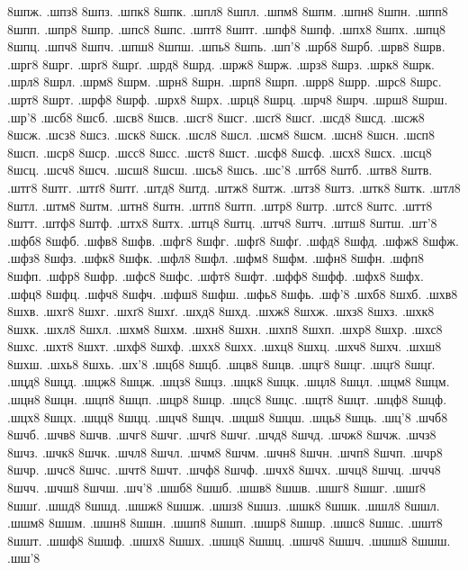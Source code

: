 {8шпж.
.шпз8
8шпз.
.шпк8
8шпк.
.шпл8
8шпл.
.шпм8
8шпм.
.шпн8
8шпн.
.шпп8
8шпп.
.шпр8
8шпр.
.шпс8
8шпс.
.шпт8
8шпт.
.шпф8
8шпф.
.шпх8
8шпх.
.шпц8
8шпц.
.шпч8
8шпч.
.шпш8
8шпш.
.шпь8
8шпь.
.шп'8
.шрб8
8шрб.
.шрв8
8шрв.
.шрг8
8шрг.
.шрґ8
8шрґ.
.шрд8
8шрд.
.шрж8
8шрж.
.шрз8
8шрз.
.шрк8
8шрк.
.шрл8
8шрл.
.шрм8
8шрм.
.шрн8
8шрн.
.шрп8
8шрп.
.шрр8
8шрр.
.шрс8
8шрс.
.шрт8
8шрт.
.шрф8
8шрф.
.шрх8
8шрх.
.шрц8
8шрц.
.шрч8
8шрч.
.шрш8
8шрш.
.шр'8
.шсб8
8шсб.
.шсв8
8шсв.
.шсг8
8шсг.
.шсґ8
8шсґ.
.шсд8
8шсд.
.шсж8
8шсж.
.шсз8
8шсз.
.шск8
8шск.
.шсл8
8шсл.
.шсм8
8шсм.
.шсн8
8шсн.
.шсп8
8шсп.
.шср8
8шср.
.шсс8
8шсс.
.шст8
8шст.
.шсф8
8шсф.
.шсх8
8шсх.
.шсц8
8шсц.
.шсч8
8шсч.
.шсш8
8шсш.
.шсь8
8шсь.
.шс'8
.штб8
8штб.
.штв8
8штв.
.штг8
8штг.
.штґ8
8штґ.
.штд8
8штд.
.штж8
8штж.
.штз8
8штз.
.штк8
8штк.
.штл8
8штл.
.штм8
8штм.
.штн8
8штн.
.штп8
8штп.
.штр8
8штр.
.штс8
8штс.
.штт8
8штт.
.штф8
8штф.
.штх8
8штх.
.штц8
8штц.
.штч8
8штч.
.штш8
8штш.
.шт'8
.шфб8
8шфб.
.шфв8
8шфв.
.шфг8
8шфг.
.шфґ8
8шфґ.
.шфд8
8шфд.
.шфж8
8шфж.
.шфз8
8шфз.
.шфк8
8шфк.
.шфл8
8шфл.
.шфм8
8шфм.
.шфн8
8шфн.
.шфп8
8шфп.
.шфр8
8шфр.
.шфс8
8шфс.
.шфт8
8шфт.
.шфф8
8шфф.
.шфх8
8шфх.
.шфц8
8шфц.
.шфч8
8шфч.
.шфш8
8шфш.
.шфь8
8шфь.
.шф'8
.шхб8
8шхб.
.шхв8
8шхв.
.шхг8
8шхг.
.шхґ8
8шхґ.
.шхд8
8шхд.
.шхж8
8шхж.
.шхз8
8шхз.
.шхк8
8шхк.
.шхл8
8шхл.
.шхм8
8шхм.
.шхн8
8шхн.
.шхп8
8шхп.
.шхр8
8шхр.
.шхс8
8шхс.
.шхт8
8шхт.
.шхф8
8шхф.
.шхх8
8шхх.
.шхц8
8шхц.
.шхч8
8шхч.
.шхш8
8шхш.
.шхь8
8шхь.
.шх'8
.шцб8
8шцб.
.шцв8
8шцв.
.шцг8
8шцг.
.шцґ8
8шцґ.
.шцд8
8шцд.
.шцж8
8шцж.
.шцз8
8шцз.
.шцк8
8шцк.
.шцл8
8шцл.
.шцм8
8шцм.
.шцн8
8шцн.
.шцп8
8шцп.
.шцр8
8шцр.
.шцс8
8шцс.
.шцт8
8шцт.
.шцф8
8шцф.
.шцх8
8шцх.
.шцц8
8шцц.
.шцч8
8шцч.
.шцш8
8шцш.
.шць8
8шць.
.шц'8
.шчб8
8шчб.
.шчв8
8шчв.
.шчг8
8шчг.
.шчґ8
8шчґ.
.шчд8
8шчд.
.шчж8
8шчж.
.шчз8
8шчз.
.шчк8
8шчк.
.шчл8
8шчл.
.шчм8
8шчм.
.шчн8
8шчн.
.шчп8
8шчп.
.шчр8
8шчр.
.шчс8
8шчс.
.шчт8
8шчт.
.шчф8
8шчф.
.шчх8
8шчх.
.шчц8
8шчц.
.шчч8
8шчч.
.шчш8
8шчш.
.шч'8
.шшб8
8шшб.
.шшв8
8шшв.
.шшг8
8шшг.
.шшґ8
8шшґ.
.шшд8
8шшд.
.шшж8
8шшж.
.шшз8
8шшз.
.шшк8
8шшк.
.шшл8
8шшл.
.шшм8
8шшм.
.шшн8
8шшн.
.шшп8
8шшп.
.шшр8
8шшр.
.шшс8
8шшс.
.шшт8
8шшт.
.шшф8
8шшф.
.шшх8
8шшх.
.шшц8
8шшц.
.шшч8
8шшч.
.шшш8
8шшш.
.шш'8
%
%
}
